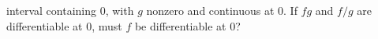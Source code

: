interval containing $0$, with $g$ nonzero and continuous at $0$.  If $fg$
and $f/g$ are differentiable at $0$, must $f$ be differentiable at 0?
